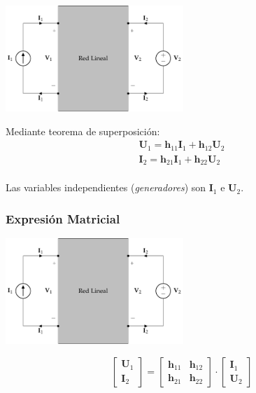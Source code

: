 \includegraphics[height=4cm]{../figs/cuadripolo_hibrido.pdf}


Mediante teorema de superposición:
\[
\begin{array}{l}
  \mathbf{U}_1 = \mathbf{h}_{11} \mathbf{I}_1 + \mathbf{h}_{12} \mathbf{U}_2\\
  \mathbf{I}_2 = \mathbf{h}_{21} \mathbf{I}_1 + \mathbf{h}_{22} \mathbf{U}_2\\
\end{array}
\]

Las variables independientes (\emph{generadores}) son \(\mathbf{I}_1\) e \(\mathbf{U}_2\).


\subsubsection{Expresión Matricial}
\label{sec:org249baea}

\includegraphics[height=4cm]{../figs/cuadripolo_hibrido.pdf}


\[
  \left[
    \begin{array}{c}
      \mathbf{U}_1\\
      \mathbf{I}_2
    \end{array}
  \right] =
  \left[
    \begin{array}{cc}
      \mathbf{h}_{11} & \mathbf{h}_{12}\\
      \mathbf{h}_{21} & \mathbf{h}_{22}
    \end{array}
  \right] \cdot
  \left[
    \begin{array}{c}
      \mathbf{I}_1\\
      \mathbf{U}_2
    \end{array}
  \right]
\]

